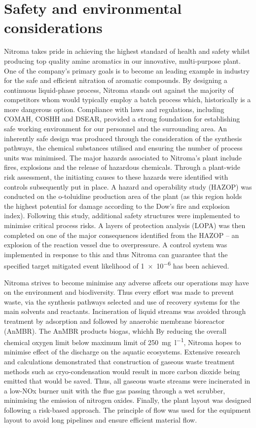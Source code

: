 \section*{Safety and environmental considerations}

Nitroma takes pride in achieving the highest standard of health and safety whilst producing top quality amine aromatics in our innovative, multi-purpose plant. One of the company's primary goals is to become an leading example in industry for the safe and efficient nitration of aromatic compounds. By designing a continuous liquid-phase process, Nitroma stands out against the majority of competitors whom would typically employ a batch process which, historically is a more dangerous option. Compliance with laws and regulations, including COMAH, COSHH and DSEAR, provided a strong foundation for establishing safe working environment for our personnel and the surrounding area. An inherently safe design was produced through the consideration of the synthesis pathways, the chemical substances utilised and ensuring the number of process units was minimised. The major hazards associated to Nitroma's plant include fires, explosions and the release of hazardous chemicals. Through a plant-wide risk assessment, the initiating causes to these hazards were identified with controls subsequently put in place. A hazard and operability study (HAZOP) was conducted on the o-toluidine production area of the plant (as this region holds the highest potential for damage according to the Dow's fire and explosion index). Following this study, additional safety structures were implemented to minimise critical process risks. A layers of protection analysis (LOPA) was then completed on one of the major consequences identified from the HAZOP – an explosion of the reaction vessel due to overpressure. A control system was implemented in response to this and thus Nitroma can guarantee that the specified target mitigated event likelihood of \num{1e-6} has been achieved.

Nitroma strives to become minimise any adverse affcets our operations may have on the environment and biodiversity. Thus every effort was made to prevent waste, via the synthesis pathways selected and use of recovery systems for the main solvents and reactants. Incineration of liquid streams was avoided through treatment by adsorption and followed by anaerobic membrane bioreactor (AnMBR). The AnMBR products biogas, whichh   By reducing the overall chemical oxygen limit below maximum limit of \SI{250}{\mg\per\litre}, Nitroma hopes to minimise effect of the discharge on the  aquatic ecosystems. Extensive research and calculations demonstrated that construction of gaseous waste treatment methods such as cryo-condensation would result in more carbon dioxide being emitted that would be saved. Thus, 
all gaseous waste streams were incinerated in a low-NOx burner unit with the flue gas passing through a wet scrubber, minimising the emission of nitrogen oxides. Finally, the plant layout was designed following a risk-based approach. The principle of flow was used for the equipment layout to avoid long pipelines and ensure efficient material flow. 